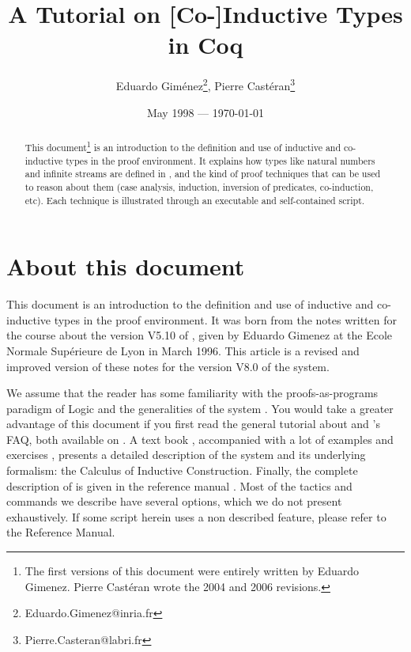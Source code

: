 \documentclass[11pt]{article}
\title{A Tutorial on [Co-]Inductive Types in Coq}
\author{Eduardo Gim\'enez\thanks{Eduardo.Gimenez@inria.fr},
Pierre Cast\'eran\thanks{Pierre.Casteran@labri.fr}}
\date{May 1998 --- \today}
\begin{document}
\maketitle

\begin{abstract}
This document\footnote{The first versions of this document were entirely written by Eduardo Gimenez.
Pierre Cast\'eran wrote the 2004 and 2006 revisions.} is an introduction to the definition and
use of inductive and co-inductive  types in the {\coq} proof environment. It explains how types like natural numbers and infinite streams are defined
in {\coq}, and the kind of proof techniques that can be used to reason
about them (case analysis, induction, inversion of predicates,
co-induction, etc).  Each technique is illustrated through an
executable and self-contained {\coq} script.  
\end{abstract}


\cleardoublepage
\tableofcontents
\clearpage

\section{About this document}

This document is an introduction to the definition and use of
inductive and co-inductive  types in the {\coq} proof environment.  It was born from the
notes written for the course about the version V5.10 of {\coq}, given
by Eduardo Gimenez  at
the Ecole Normale Sup\'erieure de Lyon in March 1996. This article is
a revised and improved version of these notes for the version V8.0 of
the system.


We assume that the reader has some familiarity with the
proofs-as-programs paradigm of Logic \cite{Coquand:metamathematical} and the generalities
of the {\coq} system \cite{coqrefman}.  You would take a greater advantage of
this document if you first read the general tutorial about {\coq} and
{\coq}'s FAQ, both available on \cite{coqsite}.
A text book \cite{coqart},  accompanied with a lot of
examples and exercises \cite{Booksite}, presents a detailed description
of the {\coq} system and its underlying
formalism: the Calculus of Inductive Construction.
Finally, the complete description of {\coq}  is given in the reference manual
\cite{coqrefman}. Most of the tactics and commands we describe have
several options, which we do not present exhaustively. 
If some script herein uses a non described feature, please refer to
the Reference Manual.
\end{document}
